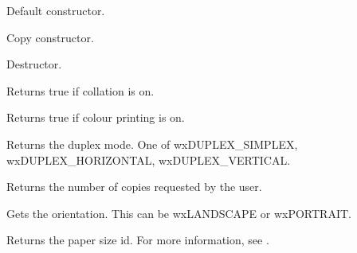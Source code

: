 


Default constructor.


Copy constructor.



Destructor.

\label{wxprintdatagetcollate}


Returns true if collation is on.

\label{wxprintdatagetcolour}


Returns true if colour printing is on.

\label{wxprintdatagetduplex}


Returns the duplex mode. One of wxDUPLEX\_SIMPLEX, wxDUPLEX\_HORIZONTAL, wxDUPLEX\_VERTICAL.

\label{wxprintdatagetnocopies}


Returns the number of copies requested by the user.

\label{wxprintdatagetorientation}


Gets the orientation. This can be wxLANDSCAPE or wxPORTRAIT.

\label{wxprintdatagetpaperid}


Returns the paper size id. For more information, see .

\label{wxprintdatagetprintername}


